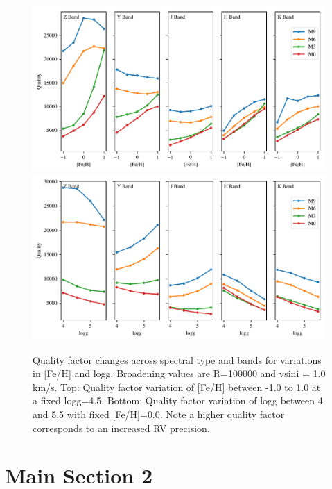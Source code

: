 \begin{figure}
\includegraphics[width=0.99\linewidth]{figures/information-content/metalicity_effect.pdf}\\
\includegraphics[width=0.99\linewidth]{figures/information-content/logg_effect.pdf}
\caption{Quality factor changes across spectral type and bands for variations in [Fe/H] and logg. Broadening values are R=100000 and vsini = 1.0 km/s. Top: Quality factor variation of [Fe/H] between -1.0 to 1.0 at a fixed logg=4.5. Bottom: Quality factor variation of logg between 4 and 5.5 with fixed [Fe/H]=0.0. Note a higher quality factor corresponds to an increased RV precision.}
\label{fig:deviations}
\end{figure}


\section{Main Section 2}



